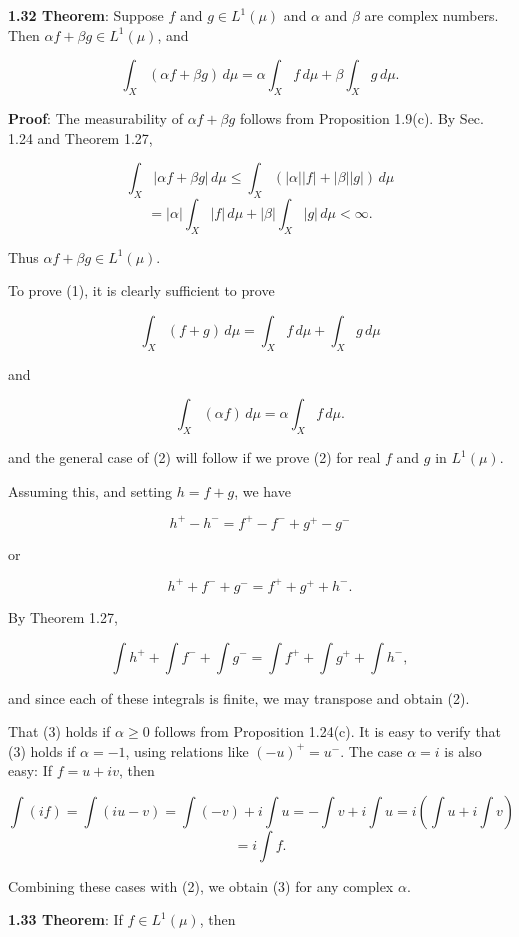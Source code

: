 \documentclass[11pt]{article}
\begin{document}
\textbf{\textbf{1.32 Theorem}}: Suppose \(f\) and \(g \in L^{1}(\mu)\) and \(\alpha\) and \(\beta\) are complex numbers. Then \(\alpha f + \beta g \in L^{1}(\mu)\), and

\[
\int_{X} (\alpha f + \beta g) \, d\mu = \alpha \int_{X} f \, d\mu + \beta \int_{X} g \, d\mu.\tag{1}
\]

\textbf{\textbf{Proof}}: The measurability of \(\alpha f + \beta g\) follows from Proposition 1.9(c). By Sec. 1.24 and Theorem 1.27,

\[
\int_{X} |\alpha f + \beta g| \, d\mu \leq \int_{X} \left( |\alpha| |f| + |\beta| |g| \right) \, d\mu
\]
\[
= |\alpha| \int_{X} |f| \, d\mu + |\beta| \int_{X} |g| \, d\mu < \infty.
\]

Thus \(\alpha f + \beta g \in L^{1}(\mu)\).

To prove (1), it is clearly sufficient to prove

\[
\int_{X} (f + g) \, d\mu = \int_{X} f \, d\mu + \int_{X} g \, d\mu\tag{2}
\]

and

\[
\int_{X} (\alpha f) \, d\mu = \alpha \int_{X} f \, d\mu.\tag{3}
\]

and the general case of (2) will follow if we prove (2) for real \(f\) and \(g\) in \(L^{1}(\mu)\).

Assuming this, and setting \(h = f + g\), we have

\[
h^{+} - h^{-} = f^{+} - f^{-} + g^{+} - g^{-}
\]

or

\[
h^{+} + f^{-} + g^{-} = f^{+} + g^{+} + h^{-}.\tag{4}
\]

By Theorem 1.27,

\[
\int h^{+} + \int f^{-} + \int g^{-} = \int f^{+} + \int g^{+} + \int h^{-},\tag{5}
\]

and since each of these integrals is finite, we may transpose and obtain (2).

That (3) holds if \(\alpha \geq 0\) follows from Proposition 1.24(c). It is easy to verify that (3) holds if \(\alpha = -1\), using relations like \((-u)^{+} = u^{-}\). The case \(\alpha = i\) is also easy: If \(f = u + iv\), then

\[
\int (i f) = \int (i u - v) = \int (-v) + i \int u = -\int v + i \int u = i \left( \int u + i \int v \right)
\]
\[
= i \int f.
\]

Combining these cases with (2), we obtain (3) for any complex \(\alpha\).

\label{org2022afd}
\textbf{\textbf{1.33 Theorem}}: If \(f \in L^{1}(\mu)\), then
\end{document}

